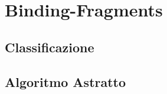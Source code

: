 \documentclass[./main.tex]{subfiles}
\begin{document}
\chapter{Binding-Fragments}
\section{Classificazione}
\section{Algoritmo Astratto}
\end{document}
